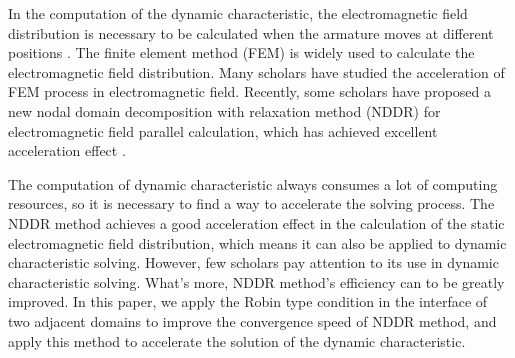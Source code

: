\documentclass[journal,transmag]{IEEEtran}
\begin{document}
In the computation of the dynamic characteristic, the electromagnetic field distribution is necessary to be calculated when the armature moves at different positions \cite{IEEEhowto:You}. The finite element method (FEM) is widely used to calculate the electromagnetic field distribution. Many scholars have studied the acceleration of FEM process in electromagnetic field. Recently, some scholars have proposed a new nodal domain decomposition with relaxation method (NDDR) for electromagnetic field parallel calculation, which has achieved excellent acceleration effect  \cite{IEEEhowto:Liu}.

The computation of dynamic characteristic always consumes a lot of computing resources, so it is necessary to find a way to accelerate the solving process. The NDDR method achieves a good acceleration effect in the calculation of the static electromagnetic field distribution, which means it can also be applied to dynamic characteristic solving. However, few scholars pay attention to its use in dynamic characteristic solving. What's more, NDDR method's efficiency can to be greatly improved. In this paper, we apply the Robin type condition in the interface of two adjacent domains to improve the convergence speed of NDDR method, and apply this method to accelerate the solution of the dynamic characteristic. 
\end{document}
